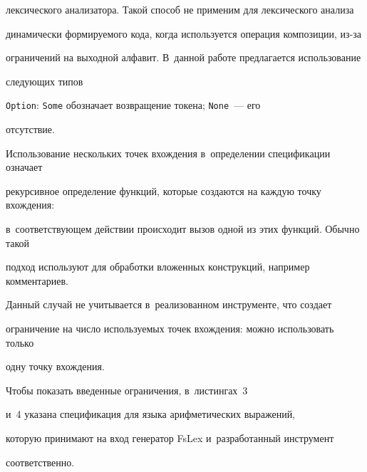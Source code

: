 лексического анализатора. Такой способ не применим для лексического анализа 


динамически формируемого кода, когда используется операция композиции, из-за 


ограничений на выходной алфавит. В~данной работе предлагается использование 


следующих типов 


\verb"Option": \verb"Some" обозначает возвращение токена; \verb"None"~--- его 


отсутствие.





Использование нескольких точек вхождения в~определении спецификации означает 


рекурсивное определение функций, которые создаются на каждую точку вхождения: 


в~соответствующем действии происходит вызов одной из этих функций. Обычно такой 


подход используют для обработки вложенных конструкций, например комментариев. 


Данный случай не учитывается в~реализованном инструменте, что создает 


ограничение на число используемых точек вхождения: можно использовать только 


одну точку вхождения.





Чтобы показать введенные ограничения, в~листингах~3 


и~4 указана спецификация для языка арифметических выражений, 


которую принимают на вход генератор FsLex и~разработанный инструмент 


соответственно.





